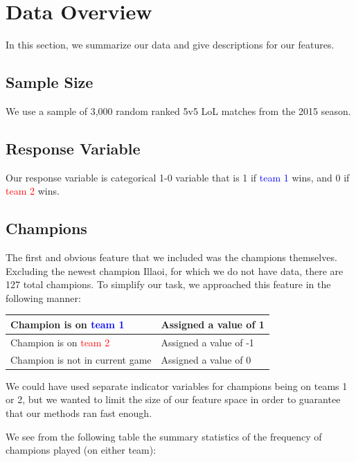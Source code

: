\documentclass[runningheads]{llncs}
\begin{document}
	\section{Data Overview}
	
	In this section, we summarize our data and give descriptions for our features.
	
	\subsection{Sample Size}
	
	We use a sample of 3,000 random ranked 5v5 LoL matches from the 2015 season.
	
	\subsection{Response Variable}
	
	Our response variable is categorical 1-0 variable that is 1 if \textcolor{blue}{team 1} wins, and 0 if \textcolor{red}{team 2} wins.
	
	\subsection{Champions}
	
	The first and obvious feature that we included was the champions themselves. Excluding the newest champion Illaoi, for which we do not have data, there are 127 total champions. To simplify our task, we approached this feature in the following manner:

	\begin{center}
		\begin{tabular}{ |l|l| }
			\hline
			Champion is on \textcolor{blue}{team 1} & Assigned a value of 1 \\ \hline
			Champion is on \textcolor{red}{team 2} & Assigned a value of -1 \\ \hline
			Champion is not in current game & Assigned a value of 0 \\ \hline
		\end{tabular}
	\end{center}
	
	We could have used separate indicator variables for champions being on teams 1 or 2, but we wanted to limit the size of our feature space in order to guarantee that our methods ran fast enough.
	
	We see from the following table the summary statistics of the frequency of champions played (on either team):
	
\end{document}
